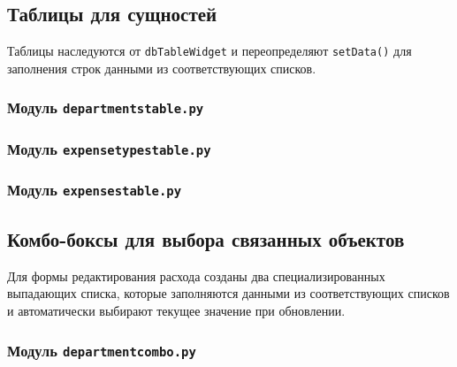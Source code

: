 \documentclass[14pt,a4paper]{extreport}
\begin{document}


\subsection{Таблицы для сущностей}

Таблицы наследуются от \texttt{dbTableWidget} и переопределяют \texttt{setData()} для заполнения строк данными из соответствующих списков.

\subsubsection{Модуль \texttt{departmentstable.py}}



\subsubsection{Модуль \texttt{expensetypestable.py}}



\subsubsection{Модуль \texttt{expensestable.py}}



\subsection{Комбо-боксы для выбора связанных объектов}

Для формы редактирования расхода созданы два специализированных выпадающих списка, которые заполняются данными из соответствующих списков и автоматически выбирают текущее значение при обновлении.

\subsubsection{Модуль \texttt{departmentcombo.py}}


\end{document}
